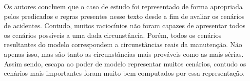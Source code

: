 Os autores concluem que o caso de estudo foi representado de forma apropriada pelos predicados e regras presentes nesse texto desde a fim de avaliar os cenários de acidentes. Contudo, muitos raciocínios não foram capazes de apresentar todos os cenários possíveis a uma dada circunstância. Porém, todos os cenários resultantes do modelo correspondem a circunstâncias reais da manutenção. Não apenas isso, mas são tanto as circunstâncias mais prováveis como as mais sérias. Assim sendo, escapa ao poder de modelo representar muitos cenários, contudo os cenários mais importantes foram muito bem computados por essa representação.